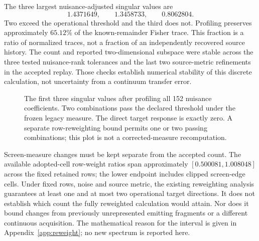 The three largest nuisance-adjusted singular values are
\begin{equation}
1.4371649,\qquad 1.3458733,\qquad 0.8062804.
\label{eq:r2singular}
\end{equation}
Two exceed the operational threshold and the third does not. Profiling preserves approximately $65.12\%$ of the known-remainder Fisher trace. This fraction is a ratio of normalized traces, not a fraction of an independently recovered source history. The count and reported two-dimensional subspace were stable across the three tested nuisance-rank tolerances and the last two source-metric refinements in the accepted replay. Those checks establish numerical stability of this discrete calculation, not uncertainty from a continuum transfer error.

\begin{figure}[htbp]
\centering
{}
\caption{The first three singular values after profiling all 152 nuisance coefficients. Two combinations pass the declared threshold under the frozen legacy measure. The direct target response is exactly zero. A separate row-reweighting bound permits one or two passing combinations; this plot is not a corrected-measure recomputation.}
\label{fig:r2}
\end{figure}

Screen-measure changes must be kept separate from the accepted count. The available adopted-cell row-weight ratios span approximately $[0.500081,1.008048]$ across the fixed retained rows; the lower endpoint includes clipped screen-edge cells. Under fixed rows, noise and source metric, the existing reweighting analysis guarantees at least one and at most two operational target directions. It does not establish which count the fully reweighted calculation would attain. Nor does it bound changes from previously unrepresented emitting fragments or a different continuous acquisition. The mathematical reason for the interval is given in Appendix~\ref{app:reweight}; no new spectrum is reported here.

